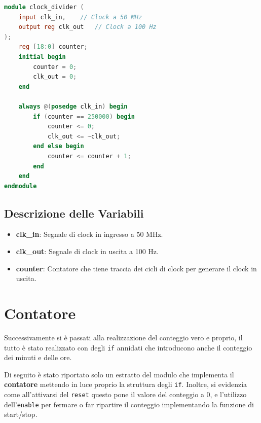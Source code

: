 \documentclass{article}
\begin{document}
\begin{lstlisting}[language=Verilog, caption={Clock Divider}]
module clock_divider (
    input clk_in,    // Clock a 50 MHz
    output reg clk_out   // Clock a 100 Hz
);
    reg [18:0] counter;
    initial begin
        counter = 0;
        clk_out = 0;
    end

    always @(posedge clk_in) begin
        if (counter == 250000) begin
            counter <= 0;
            clk_out <= ~clk_out;
        end else begin
            counter <= counter + 1;
        end
    end
endmodule
\end{lstlisting}

\subsection{Descrizione delle Variabili} 

\begin{itemize} 
    \item \textbf{clk\_in}: Segnale di clock in ingresso a 50 MHz.
    \item \textbf{clk\_out}: Segnale di clock in uscita a 100 Hz.
    \item \textbf{counter}: Contatore che tiene traccia dei cicli di clock per generare il clock in uscita.
\end{itemize}

\newpage

\section{Contatore}

Successivamente si è passati alla realizzazione del conteggio vero e proprio, il tutto è stato realizzato con degli \texttt{if} annidati che introducono anche il conteggio dei minuti e delle ore.

Di seguito è stato riportato solo un estratto del modulo che implementa il \textbf{contatore} mettendo in luce proprio la struttura degli \texttt{if}. Inoltre, si evidenzia come all'attivarsi del \texttt{reset} questo pone il valore del conteggio a 0, e l'utilizzo dell'\texttt{enable} per fermare o far ripartire il conteggio implementando la funzione di start/stop.
\end{document}

